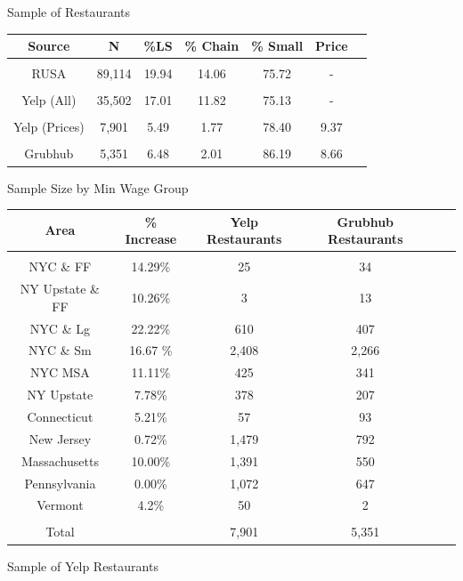 \documentclass[xcolor=table]{beamer}
\begin{document}
\begin{spacing}{1.2}
\begin{frame}{Sample of Restaurants}

\centering
\small
\begin{tabular}{ccccccc } \\ \hline \hline
Source & N & \%LS  & \% Chain   & \% Small & Price \\ \hline \hline
&&& \\
RUSA & 89,114 & 19.94 & 14.06 & 75.72 & -\\
\\
Yelp (All) & 35,502 & 17.01 & 11.82 & 75.13& - \\
\\
Yelp (Prices) & 7,901 & 5.49  & 1.77 & 78.40 & 9.37 \\
\\ 
Grubhub  & 5,351 & 6.48 & 2.01 &  86.19 & 8.66 \\
\end{tabular}
\end{frame}

\begin{frame}{Sample Size by Min Wage Group}
\scriptsize
\centering
\begin{tabular}{c c c c c c } \\ \hline \hline
Area & \% Increase & Yelp Restaurants   & Grubhub Restaurants\\ \hline \hline
&&& \\
 NYC \& FF  & 14.29\% & 25   & 34 \\
 NY Upstate \& FF  & 10.26\% & 3&13 \\
NYC \& Lg & 22.22\% & 610 &  407\\
NYC \& Sm & 16.67 \% & 2,408 &  2,266\\
NYC MSA & 11.11\% & 425 &341\\
NY Upstate & 7.78\% & 378 &  207 \\
Connecticut & 5.21\% & 57  &  93 \\
New Jersey & 0.72\% & 1,479 & 792\\
Massachusetts & 10.00\% & 1,391 &  550\\
Pennsylvania & 0.00\% &  1,072 &  647\\
Vermont & 4.2\% & 50 & 2\\
\\ \hline
Total & & 7,901 &  5,351 \\
\end{tabular}
\end{frame}


\begin{frame}{Sample of Yelp Restaurants}


\end{frame}
\end{spacing}
\end{document}
